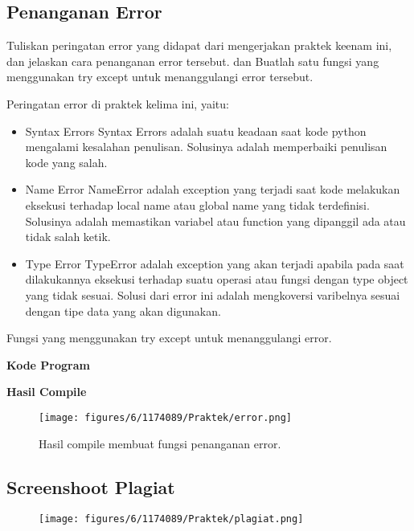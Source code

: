 \subsection{Penanganan Error}
Tuliskan  peringatan  error  yang  didapat  dari  mengerjakan  praktek  keenam  ini, dan  jelaskan  cara  penanganan  error  tersebut. dan  Buatlah  satu  fungsi  yang menggunakan try except untuk menanggulangi error tersebut.

\hfill \break
Peringatan error di praktek kelima ini, yaitu:
\begin{itemize}
	\item Syntax Errors
	Syntax Errors adalah suatu keadaan saat kode python mengalami kesalahan penulisan. Solusinya adalah memperbaiki penulisan kode yang salah.
	
	\item Name Error
	NameError adalah exception yang terjadi saat kode melakukan eksekusi terhadap local name atau global name yang tidak terdefinisi. Solusinya adalah memastikan variabel atau function yang dipanggil ada atau tidak salah ketik.
	
	\item Type Error
	TypeError adalah exception yang akan terjadi apabila pada saat dilakukannya eksekusi terhadap suatu operasi atau fungsi dengan type object yang tidak sesuai. Solusi dari error ini adalah mengkoversi varibelnya sesuai dengan tipe data yang akan digunakan.
\end{itemize}
\hfill \break
Fungsi yang menggunakan try except untuk menanggulangi error.

\hfill \break
\textbf{Kode Program}



\hfill \break
\textbf{Hasil Compile}

\begin{figure}[H]
	\texttt{[image: figures/6/1174089/Praktek/error.png]}
	\centering
	\caption{Hasil compile membuat fungsi penanganan error.}
\end{figure}

\subsection{Screenshoot Plagiat}
\begin{figure}[H]
	\texttt{[image: figures/6/1174089/Praktek/plagiat.png]}
	\centering
\end{figure}
